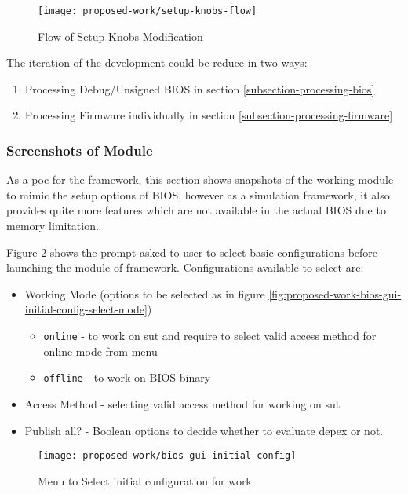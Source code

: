 \begin{figure}[!htbp]
	\centering
	\texttt{[image: proposed-work/setup-knobs-flow]}
	\caption{Flow of Setup Knobs Modification}\label{fig:setup-knobs-flow}
\end{figure}

The iteration of the development could be reduce in two ways:
\begin{enumerate}
	\item Processing Debug/Unsigned BIOS in section \ref{subsection-processing-bios}
	\item Processing Firmware individually in section \ref{subsection-processing-firmware}
\end{enumerate}


\subsubsection{Screenshots of Module}
As a \gls{poc} for the framework, this section shows snapshots of the working module to mimic the setup options of BIOS, however as a simulation framework, it also provides quite more features which are not available in the actual BIOS due to memory limitation.

Figure \ref{fig:proposed-work-bios-gui-initial-config} shows the prompt asked to user to select basic configurations before launching the module of framework. Configurations available to select are:

\begin{itemize}
	\item Working Mode (options to be selected as in figure \ref{fig:proposed-work-bios-gui-initial-config-select-mode})
	\begin{itemize}
		\item \verb|online| - to work on \gls{sut} and require to select valid access method for online mode from menu
		\item \verb|offline| - to work on BIOS binary
	\end{itemize}
	\item Access Method - selecting valid access method for working on \gls{sut}
	\item Publish all? - Boolean options to decide whether to evaluate \gls{depex} or not.
\end{itemize}

\begin{figure}[!htbp]
	\centering
	\texttt{[image: proposed-work/bios-gui-initial-config]}
	\caption{Menu to Select initial configuration for work}\label{fig:proposed-work-bios-gui-initial-config}
\end{figure}

